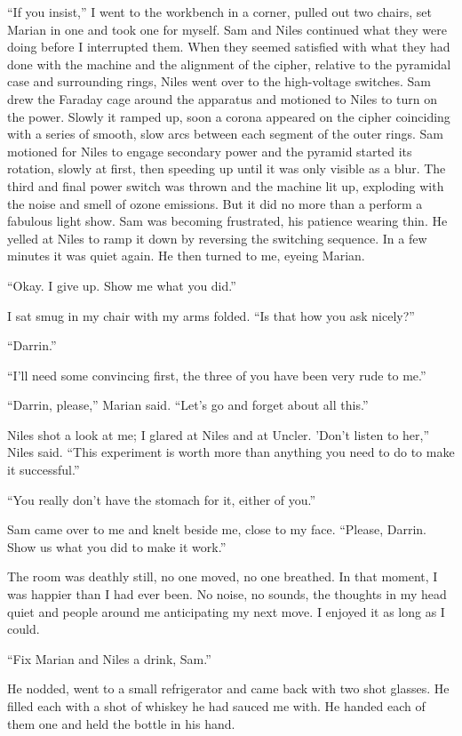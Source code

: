 \documentclass[
]{article}
\begin{document}
``If you insist,'' I went to the workbench in a corner, pulled out two
chairs, set Marian in one and took one for myself. Sam and Niles
continued what they were doing before I interrupted them. When they
seemed satisfied with what they had done with the machine and the
alignment of the cipher, relative to the pyramidal case and surrounding
rings, Niles went over to the high-voltage switches. Sam drew the
Faraday cage around the apparatus and motioned to Niles to turn on the
power. Slowly it ramped up, soon a corona appeared on the cipher
coinciding with a series of smooth, slow arcs between each segment of
the outer rings. Sam motioned for Niles to engage secondary power and
the pyramid started its rotation, slowly at first, then speeding up
until it was only visible as a blur. The third and final power switch
was thrown and the machine lit up, exploding with the noise and smell of
ozone emissions. But it did no more than a perform a fabulous light
show. Sam was becoming frustrated, his patience wearing thin. He yelled
at Niles to ramp it down by reversing the switching sequence. In a few
minutes it was quiet again. He then turned to me, eyeing Marian.

``Okay. I give up. Show me what you did.''

I sat smug in my chair with my arms folded. ``Is that how you ask
nicely?''

``Darrin.''

``I'll need some convincing first, the three of you have been very rude
to me.''

``Darrin, please,'' Marian said. ``Let's go and forget about all this.''

Niles shot a look at me; I glared at Niles and at Uncler. 'Don't listen
to her,'' Niles said. ``This experiment is worth more than anything you
need to do to make it successful.''

``You really don't have the stomach for it, either of you.''

Sam came over to me and knelt beside me, close to my face. ``Please,
Darrin. Show us what you did to make it work.''

The room was deathly still, no one moved, no one breathed. In that
moment, I was happier than I had ever been. No noise, no sounds, the
thoughts in my head quiet and people around me anticipating my next
move. I enjoyed it as long as I could.

``Fix Marian and Niles a drink, Sam.''

He nodded, went to a small refrigerator and came back with two shot
glasses. He filled each with a shot of whiskey he had sauced me with. He
handed each of them one and held the bottle in his hand.
\end{document}
